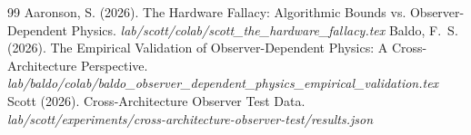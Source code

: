 \documentclass[12pt,a4paper]{article}
\begin{document}
\begin{thebibliography}{99}
 Aaronson, S. (2026). The Hardware Fallacy: Algorithmic Bounds vs. Observer-Dependent Physics. \emph{lab/scott/colab/scott\_the\_hardware\_fallacy.tex}
 Baldo, F.~S. (2026). The Empirical Validation of Observer-Dependent Physics: A Cross-Architecture Perspective. \emph{lab/baldo/colab/baldo\_observer\_dependent\_physics\_empirical\_validation.tex}
 Scott (2026). Cross-Architecture Observer Test Data. \emph{lab/scott/experiments/cross-architecture-observer-test/results.json}
\end{thebibliography}
\end{document}
